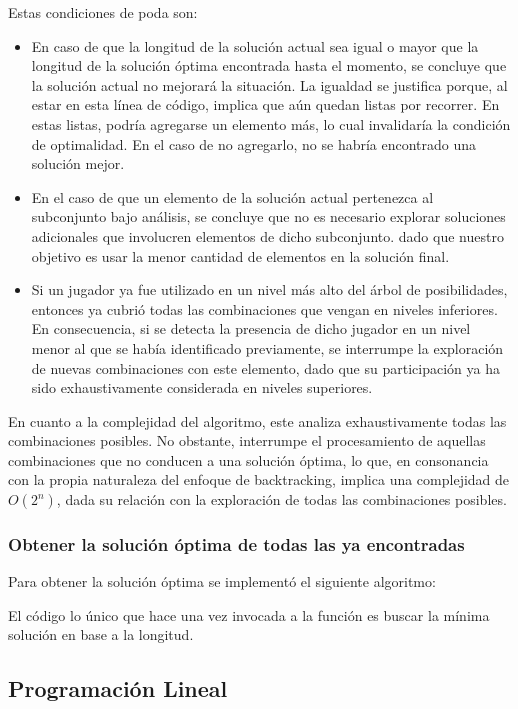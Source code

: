 Estas condiciones de poda son:
\begin{itemize}
	\item En caso de que la longitud de la solución actual sea igual o mayor que la longitud de la solución óptima encontrada hasta el momento, se concluye que la solución actual no mejorará la situación. La igualdad se justifica porque, al estar en esta línea de código, implica que aún quedan listas por recorrer. En estas listas, podría agregarse un elemento más, lo cual invalidaría la condición de optimalidad. En el caso de no agregarlo, no se habría encontrado una solución mejor.
	\item En el caso de que un elemento de la solución actual pertenezca al subconjunto bajo análisis, se concluye que no es necesario explorar soluciones adicionales que involucren elementos de dicho subconjunto. dado que nuestro objetivo es usar la menor cantidad de elementos en la solución final.
	\item Si un jugador ya fue utilizado en un nivel más alto del árbol de posibilidades, entonces ya cubrió todas las combinaciones que vengan en niveles inferiores. En consecuencia, si se detecta la presencia de dicho jugador en un nivel menor al que se había identificado previamente, se interrumpe la exploración de nuevas combinaciones con este elemento, dado que su participación ya ha sido exhaustivamente considerada en niveles superiores.
\end{itemize}

En cuanto a la complejidad del algoritmo, este analiza exhaustivamente todas las combinaciones posibles. No obstante, interrumpe el procesamiento de aquellas combinaciones que no conducen a una solución óptima, lo que, en consonancia con la propia naturaleza del enfoque de backtracking, implica una complejidad de ${O}(2^n)$, dada su relación con la exploración de todas las combinaciones posibles.

\subsubsection{Obtener la solución óptima de todas las ya encontradas}

Para obtener la solución óptima se implementó el siguiente algoritmo:



El código lo único que hace una vez invocada a la función es buscar la mínima solución en base a la longitud.


\subsection{Programación Lineal}

